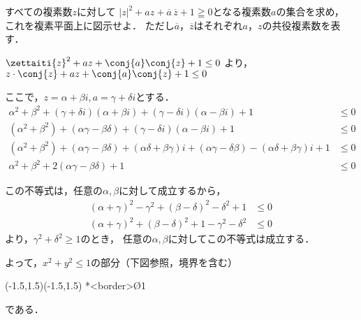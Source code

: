 \begin{problem}
  すべての複素数$z$に対して
${|z|}^2+az+\overline{a}\,\overline{z}+1\geqq0$となる複素数$a$の集合を求め，
これを複素平面上に図示せよ．
ただし$\overline{a}$，$\overline{z}$はそれぞれ$a$，$z$の共役複素数を表す．
\end{problem}

$\zettaiti{z}^2 + az + \conj{a}\conj{z} + 1 \leq 0$ より，
$z\cdot \conj{z} + az + \conj{a}\conj{z} + 1 \leq 0$

ここで，$z = \alpha + \beta i, a = \gamma + \delta i$とする．
\begin{align*}
  \alpha^2 + \beta^2 + (\gamma + \delta i)(\alpha + \beta i) + (\gamma - \delta i)(\alpha - \beta i) + 1 &\leq 0 \\
  (\alpha^2 + \beta^2) + (\alpha\gamma-\beta\delta) + (\gamma-\delta i)(\alpha - \beta i) + 1 &\leq 0 \\
  (\alpha^2 + \beta^2) + (\alpha\gamma-\beta\delta) + (\alpha\delta + \beta\gamma)i + (\alpha\gamma - \delta\beta) - (\alpha\delta + \beta\gamma)i + 1 &\leq 0 \\
  \alpha^2 + \beta^2 + 2(\alpha\gamma - \beta\delta) + 1 &\leq 0
\end{align*}

この不等式は，任意の$\alpha,\beta$に対して成立するから，
\begin{align*}
  (\alpha + \gamma)^2 - \gamma^2 + (\beta - \delta)^2 - \delta^2 + 1 &\leq 0 \\
  (\alpha + \gamma)^2 + (\beta-\delta)^2 + 1 -\gamma^2 - \delta^2 &\leq 0
\end{align*}
より，$\gamma^2 + \delta^2 \geq 1$のとき，
任意の$\alpha, \beta$に対してこの不等式は成立する．

よって，$x^2 + y^2 \leq 1$の部分（下図参照，境界を含む）
\begin{center}
  \begin{pszahyou}[ul=20mm](-1.5,1.5)(-1.5,1.5)
    \En**<border>\O{1}
  \end{pszahyou}
\end{center}
である．

